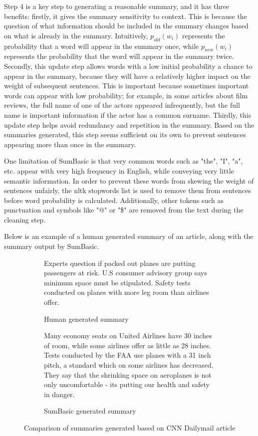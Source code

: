 \documentclass[../writeup.tex]{subfiles}
\begin{document}
Step 4 is a key step to generating a reasonable summary, and it has three benefits: firstly, it gives the summary sensitivity to context.
This is because the question of what information should be included in the summary changes based on what is already in the summary.
Intuitively, $p_{old}(w_i)$ represents the probability that a word will appear in the summary once, while $p_{new}(w_i)$ represents the probability that the word will appear in the summary twice.
Secondly, this update step allows words with a low initial probability a chance to appear in the summary, because they will have a relatively higher impact on the weight of subsequent sentences.
This is important because sometimes important words can appear with low probability; for example, in some articles about film reviews, the full name of one of the actors appeared infrequently, but the full name is important information if the actor has a common surname.
Thirdly, this update step helps avoid redundancy and repetition in the summary.\autocite*[]{sumbasic} Based on the summaries generated, this step seems sufficient on its own to prevent sentences appearing more than once in the summary.

One limitation of SumBasic is that very common words such as "the", "I", "a", etc. appear with very high frequency in English, while conveying very little semantic information.
In order to prevent these words from skewing the weight of sentences unfairly, the nltk stopwords list is used to remove them from sentences before word probability is calculated.
Additionally, other tokens such as punctuation and symbols like "@" or "\$" are removed from the text during the cleaning step.

Below is an example of a human generated summary of an article, along with the summary output by SumBasic.
\begin{figure}[h]
    \centering
    \begin{subfigure}{.5\textwidth}
        \centering
        {\small
            Experts question if packed out planes are putting passengers at risk.
            U.S consumer advisory group says minimum space must be stipulated.
            Safety tests conducted on planes with more leg room than airlines offer.}
        \caption{Human generated summary}
        \label{sam:fig:humman_cnn_summary}
    \end{subfigure}%
    \begin{subfigure}{0.5\textwidth}
        \centering
        {\small
            Many economy seats on United Airlines have 30 inches of room, while some airlines offer as little as 28 inches.
            Tests conducted by the FAA use planes with a 31 inch pitch, a standard which on some airlines has decreased.
            They say that the shrinking space on aeroplanes is not only uncomfortable - its putting our health and safety in danger.}
        \caption{SumBasic generated summary}
        \label{sam:fig:basic_cnn_summary}
    \end{subfigure}
    \caption{Comparison of summaries generated based on CNN Dailymail article}
    \label{sam:fig:basic_summary_comparison}
\end{figure}
\end{document}
